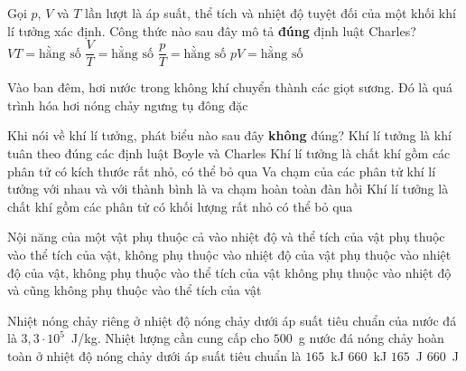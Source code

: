 	\begin{ex}%
		Gọi $p$, $V$ và $T$ lần lượt là áp suất, thể tích và nhiệt độ tuyệt đối của một khối khí lí tưởng xác định. Công thức nào sau đây mô tả \textbf{đúng} định luật Charles?
		\choice
		{$VT=\text{hằng số}$}
		{\True $\dfrac{V}{T}=\text{hằng số}$}
		{$\dfrac{p}{T}=\text{hằng số}$}
		{$pV=\text{hằng số}$}
	\end{ex}

	\begin{ex}%
		Vào ban đêm, hơi nước trong không khí chuyển thành các giọt sương. Đó là quá trình
		\choice
		{hóa hơi}
		{nóng chảy}
		{\True ngưng tụ}
		{đông đặc}
	\end{ex}

	\begin{ex}%
		Khi nói về khí lí tưởng, phát biểu nào sau đây \textbf{không} đúng?
		\choice
		{Khí lí tưởng là khí tuân theo đúng các định luật Boyle và Charles}
		{Khí lí tưởng là chất khí gồm các phân tử có kích thước rất nhỏ, có thể bỏ qua}
		{Va chạm của các phân tử khí lí tưởng với nhau và với thành bình là va chạm hoàn toàn đàn hồi}
		{\True Khí lí tưởng là chất khí gồm các phân tử có khối lượng rất nhỏ có thể bỏ qua}
	\end{ex}

	\begin{ex}%
		Nội năng của một vật
		\choice
		{\True phụ thuộc cả vào nhiệt độ và thể tích của vật}
		{phụ thuộc vào thể tích của vật, không phụ thuộc vào nhiệt độ của vật}
		{phụ thuộc vào nhiệt độ của vật, không phụ thuộc vào thể tích của vật}
		{không phụ thuộc vào nhiệt độ và cũng không phụ thuộc vào thể tích của vật}
	\end{ex}

	\begin{ex}%
		Nhiệt nóng chảy riêng ở nhiệt độ nóng chảy dưới áp suất tiêu chuẩn của nước đá là $3{,}3\cdot 10^5$~J/kg. Nhiệt lượng cần cung cấp cho $500$~g nước đá nóng chảy hoàn toàn ở nhiệt độ nóng chảy dưới áp suất tiêu chuẩn là
		\choice
		{\True $165$~kJ}
		{$660$~kJ}
		{$165$~J}
		{$660$~J}
	\end{ex}

